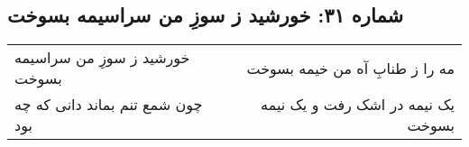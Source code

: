 \begin{center}
\section*{شماره ۳۱: خورشید ز سوزِ من سراسیمه بسوخت}
\label{sec:031}
\begin{longtable}{l p{0.5cm} r}
خورشید ز سوزِ من سراسیمه بسوخت
&&
مه را ز طنابِ آه من خیمه بسوخت
\\
چون شمع تنم بماند دانی که چه بود
&&
یک نیمه در اشک رفت و یک نیمه بسوخت
\\
\end{longtable}
\end{center}
